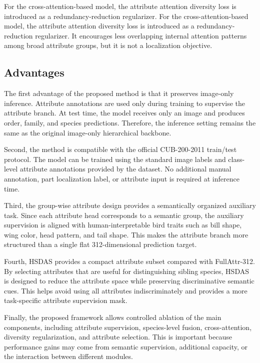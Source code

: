 For the cross-attention-based model, the attribute attention diversity loss is introduced as a redundancy-reduction regularizer. For the cross-attention-based model, the attribute attention diversity loss is introduced as a redundancy-reduction regularizer. It encourages less overlapping internal attention patterns among broad attribute groups, but it is not a localization objective.

\subsection{Advantages}

The first advantage of the proposed method is that it preserves image-only inference. Attribute annotations are used only during training to supervise the attribute branch. At test time, the model receives only an image and produces order, family, and species predictions. Therefore, the inference setting remains the same as the original image-only hierarchical backbone.

Second, the method is compatible with the official CUB-200-2011 train/test protocol. The model can be trained using the standard image labels and class-level attribute annotations provided by the dataset. No additional manual annotation, part localization label, or attribute input is required at inference time.

Third, the group-wise attribute design provides a semantically organized auxiliary task. Since each attribute head corresponds to a semantic group, the auxiliary supervision is aligned with human-interpretable bird traits such as bill shape, wing color, head pattern, and tail shape. This makes the attribute branch more structured than a single flat 312-dimensional prediction target.

Fourth, HSDAS provides a compact attribute subset compared with FullAttr-312. By selecting attributes that are useful for distinguishing sibling species, HSDAS is designed to reduce the attribute space while preserving discriminative semantic cues. This helps avoid using all attributes indiscriminately and provides a more task-specific attribute supervision mask.

Finally, the proposed framework allows controlled ablation of the main components, including attribute supervision, species-level fusion, cross-attention, diversity regularization, and attribute selection. This is important because performance gains may come from semantic supervision, additional capacity, or the interaction between different modules.

